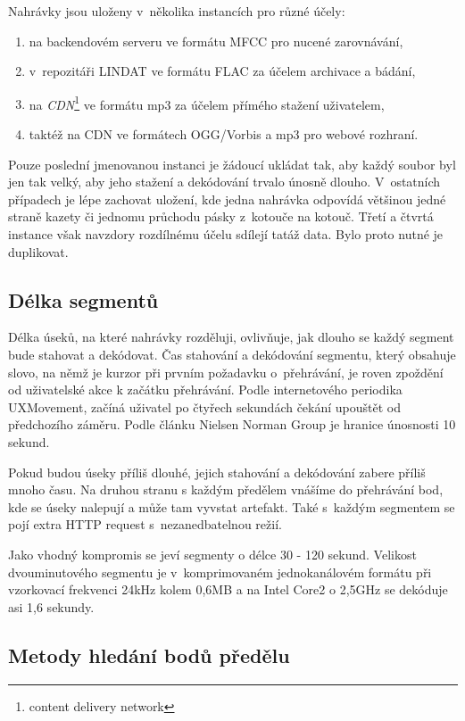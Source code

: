Nahrávky jsou uloženy v~několika instancích pro různé účely:

\begin{enumerate}
\item{na backendovém serveru ve formátu MFCC pro nucené zarovnávání,}
\item{v~repozitáři LINDAT ve formátu FLAC za účelem archivace a bádání,}
\item{na {\em CDN}\footnote{content delivery network} ve formátu mp3 za účelem přímého stažení uživatelem,}
\item{taktéž na CDN ve formátech OGG/Vorbis a mp3 pro webové rozhraní.}
\end{enumerate}

Pouze poslední jmenovanou instanci je žádoucí ukládat tak, aby každý soubor byl
jen tak velký, aby jeho stažení a dekódování trvalo únosně dlouho. V~ostatních
případech je lépe zachovat uložení, kde jedna nahrávka odpovídá většinou
jedné straně kazety či jednomu průchodu pásky z~kotouče na kotouč. Třetí a čtvrtá
instance však navzdory rozdílnému účelu sdílejí tatáž data. Bylo proto nutné je
duplikovat.

\subsection{Délka segmentů}

Délka úseků, na které nahrávky rozděluji, ovlivňuje, jak dlouho se každý segment
bude stahovat a dekódovat.  Čas stahování a dekódování segmentu, který obsahuje
slovo, na němž je kurzor při prvním požadavku o~přehrávání, je roven zpoždění od
uživatelské akce k začátku přehrávání. Podle internetového periodika
UXMovement\cite{foursecondrule}, začíná uživatel po čtyřech sekundách čekání
upouštět od předchozího záměru. Podle článku Nielsen Norman
Group\cite{websiteresponsetimes} je hranice únosnosti 10 sekund.

Pokud budou úseky příliš dlouhé, jejich stahování a dekódování zabere příliš
mnoho času. Na druhou stranu s každým předělem vnášíme do přehrávání bod, kde se
úseky nalepují a může tam vyvstat artefakt. Také s~každým segmentem se pojí
extra HTTP request s~nezanedbatelnou režií.

Jako vhodný kompromis se jeví segmenty o délce 30 - 120 sekund. Velikost
dvouminutového segmentu je v~komprimovaném jednokanálovém formátu při vzorkovací
frekvenci 24kHz kolem 0,6MB a na Intel Core2 o 2,5GHz se dekóduje asi 1,6
sekundy.

\subsection{Metody hledání bodů předělu}
\label{ssec:splitpoint-selection}

